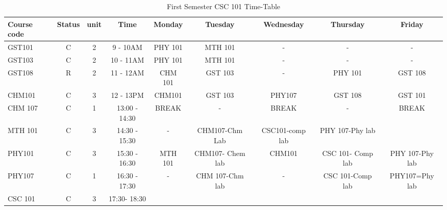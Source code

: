 \documentclass{article}
\begin{document}
\begin{sidewaystable}[!ht]	
	\begin{center}
		
\caption{First Semester CSC 101 Time-Table}	
	\label{tab:table1}	
	\begin{tabular}{l|c|c|c|c|c|c|c|c|}
		\hline
\textbf{Course code}  &\cellcolor{red!35} \textbf{Status} & \cellcolor{red!35}\textbf{unit} & \cellcolor{red!35}\textbf{Time} &\cellcolor{blue!25} \textbf{Monday}  &\cellcolor{blue!25}\textbf{Tuesday}  & \cellcolor{blue!25}\textbf{Wednesday} & \cellcolor{blue!25}\textbf{Thursday}  & \cellcolor{blue!25}\textbf{Friday}\\
\hline
\cellcolor{red!35}GST101 & C & 2 & 9 - 10AM & PHY 101 & MTH 101 & -& - & - \\
\hline 
\cellcolor{blue!25}GST103  & C & 2 & 10 - 11AM & PHY 101 & MTH 101 & -&-&-\\
\hline
\cellcolor{red!35}GST108 & R & 2& 11 - 12AM & CHM 101 & GST 103 & - & PHY 101 & GST 108 \\
\hline
\cellcolor{green!20}CHM101 & C & 3 & 12 - 13PM & CHM101 & GST 103 & PHY107 & GST 108 & GST 101\\
\hline
\cellcolor{blue!25}CHM 107  & C & 1 & 13:00 - 14:30 & BREAK & - & BREAK & - & BREAK\\
\hline
\cellcolor{red!35}MTH 101 & C & 3 & 14:30 - 15:30 &
-& CHM107-Chm Lab
& CSC101-comp lab &PHY 107-Phy lab &\\
\hline
\cellcolor{green!20}PHY101 &C & 3 & 15:30 - 16:30 & MTH 101 & CHM107- Chem lab & CHM101 & CSC 101- Comp lab & PHY 107-Phy lab\\
\hline
\cellcolor{blue!25}PHY107 &
C & 1 & 16:30 - 17:30 & -  & CHM 107-Chm lab & -& CSC 101-Comp lab & PHY107=Phy lab\\
\hline
\cellcolor{red!35}CSC 101& C & 3 & 17:30- 18:30 &&&&& \\
\hline

\end{tabular}
\end{center}
\end{sidewaystable}
\end{document}
